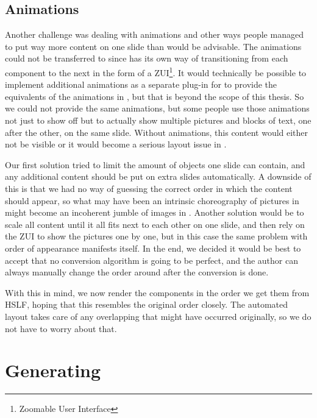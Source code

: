    \subsection{Animations}

    Another challenge was dealing with animations and other ways people managed
    to put way more content on one slide than would be advisable. The
    animations could not be transferred to \mxp since \mxp has its own way of
    transitioning from each component to the next in the form of a
    ZUI\footnote{Zoomable User Interface}. It would technically be possible to
    implement additional animations as a separate plug-in for \mxp to provide
    the equivalents of the animations in \ppt*, but that is beyond the scope of
    this thesis. So we could not provide the same animations, but some people
    use those animations not just to show off but to actually show multiple
    pictures and blocks of text, one after the other, on the same slide.
    Without animations, this content would either not be visible or it would
    become a serious layout issue in \mxp.
   
    Our first solution tried to limit the amount of objects one slide can
    contain, and any additional content should be put on extra slides
    automatically. A downside of this is that we had no way of guessing the
    correct order in which the content should appear, so what may have been an
    intrinsic choreography of pictures in \ppt might become an incoherent
    jumble of images in \mxp. Another solution would be to scale all content
    until it all fits next to each other on one slide, and then rely on the ZUI
    to show the pictures one by one, but in this case the same problem with
    order of appearance manifests itself. In the end, we decided it would be
    best to accept that no conversion algorithm is going to be perfect, and the
    author can always manually change the order around after the conversion is
    done.

    With this in mind, we now render the components in the order we get them
    from HSLF, hoping that this resembles the original order closely. The
    automated layout takes care of any overlapping that might have occurred
    originally, so we do not have to worry about that.

  \section{Generating \mxp}

